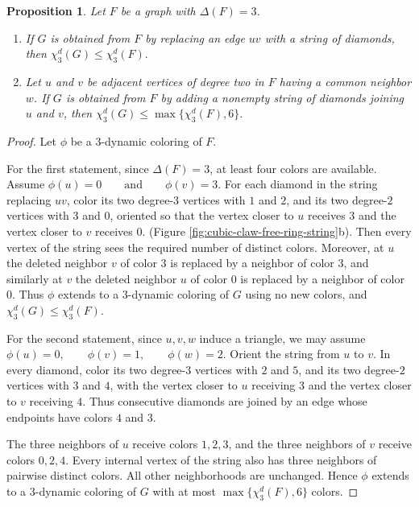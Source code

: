 \documentclass[10pt,a4paper]{article}
\newtheorem{proposition}[theorem] {Proposition}
\theoremstyle{case}
\numberwithin{subcase}{case}
\begin{document}
\begin{proposition}\label{prop:chi3Gleqchi3F}
Let $F$ be a graph with $\Delta(F)=3$.

\begin{enumerate}
    \item If $G$ is obtained from $F$ by replacing an edge $uv$ with a
    string of diamonds, then
    ${\chi_3^d(G)\leq \chi_3^d(F).}$
    \item Let $u$ and $v$ be adjacent vertices of degree two in $F$
    having a common neighbor $w$. If $G$ is obtained from $F$ by adding
    a nonempty string of diamonds joining $u$ and $v$, then
    $
        \chi_3^d(G)\leq \max\{\chi_3^d(F),6\}.
    $
\end{enumerate}
\end{proposition}


\begin{proof}
Let $\phi$ be a $3$-dynamic coloring of $F$.

For the first statement, since $\Delta(F)=3$, at least four colors are
available. Assume
$
\phi(u)=0
\qquad\text{and}\qquad
\phi(v)=3.
$
For each diamond in the string replacing $uv$, color its two degree-$3$
vertices with $1$ and $2$, and its two degree-$2$ vertices with $3$ and
$0$, oriented so that the vertex closer to $u$ receives $3$ and the
vertex closer to $v$ receives $0$.
(Figure \ref{fig:cubic-claw-free-ring-string}b).
Then every vertex of the string sees the required number of distinct
colors. Moreover, at $u$ the deleted neighbor $v$ of color $3$ is
replaced by a neighbor of color $3$, and similarly at $v$ the deleted
neighbor $u$ of color $0$ is replaced by a neighbor of color $0$.
Thus $\phi$ extends to a $3$-dynamic coloring of $G$ using no new
colors, and
$
\chi_3^d(G)\leq\chi_3^d(F).
$

For the second statement, 
since $u,v,w$ induce a triangle,
we may assume
$
\phi(u)=0,\qquad
\phi(v)=1,\qquad
\phi(w)=2.
$
Orient the string from $u$ to $v$. In every diamond, color its two
degree-$3$ vertices with $2$ and $5$, and its two degree-$2$ vertices
with $3$ and $4$, with the vertex closer to $u$ receiving $3$ and the
vertex closer to $v$ receiving $4$. Thus consecutive diamonds are
joined by an edge whose endpoints have colors $4$ and $3$.

The three neighbors of $u$ receive colors $1,2,3$, and the three
neighbors of $v$ receive colors $0,2,4$. Every internal vertex of the
string also has three neighbors of pairwise distinct colors. All other neighborhoods are unchanged.
Hence $\phi$ extends to a $3$-dynamic coloring of $G$ with at most
$\max\{\chi_3^d(F),6\}$ colors.
\end{proof}
\end{document}
